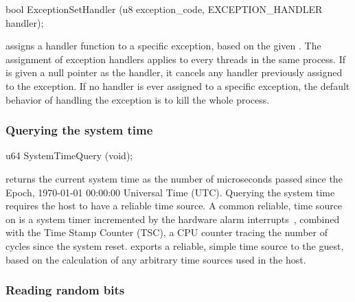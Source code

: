 \begin{paldef}
bool ExceptionSetHandler (u8 exception_code,
                          EXCEPTION_HANDLER handler);
\end{paldef}

 assigns a handler function to a specific exception, based on the given .
The assignment of exception handlers
applies to every threads in the same process.
If  is given a null pointer as the handler,
it cancels any handler previously assigned to the exception.
If no handler is ever assigned to a specific exception,
the default behavior of handling the exception is to kill the whole process.










\subsubsection*{Querying the system time}


\begin{paldef}
u64 SystemTimeQuery (void);
\end{paldef}


 returns the current system time as
the number of microseconds passed since the Epoch, 1970-01-01 00:00:00 Universal Time (UTC).
Querying the system time
requires the host to have a reliable time source.
A common reliable, time source on \graphenearch{}
is a system timer incremented by the hardware alarm interrupts~\cite{love10linux-kernel},
combined with the Time Stamp Counter (TSC), a CPU counter tracing the number of cycles since the system reset.
 exports a reliable, simple time source
to the guest, based on the calculation of any arbitrary time sources used in the host.




\subsubsection*{Reading random bits}



